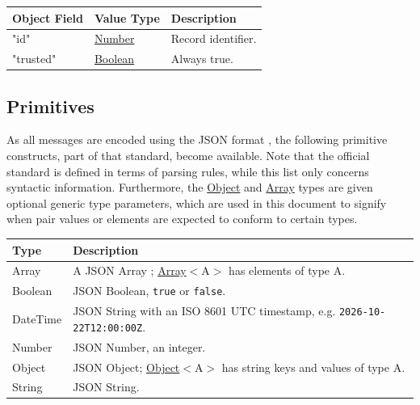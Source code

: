 \documentclass[a4paper]{arrowhead}
\newcommand{\pdef}[1]{{\textcolor{ArrowheadGrey}{#1 \label{sec:model:primitives:#1} \label{sec:model:primitives:#1s}}}}
\newcommand{\pref}[1]{{\textcolor{ArrowheadGrey}{\hyperref[sec:model:primitives:#1]{#1}}}}
\begin{document}




\noindent\begin{tabularx}{\textwidth}{| >{\raggedright\arraybackslash}p{3.9cm} | >{\raggedright\arraybackslash\small}p{5.3cm} | X |} \hline
\rowcolor{gray!33} Object Field & Value Type & Description \\ \hline
"id" & \pref{Number} & Record identifier. \\ \hline
"trusted" & \pref{Boolean} & Always true. \\ \hline
\end{tabularx}



\subsection{Primitives}
\label{sec:model:primitives}

As all messages are encoded using the JSON format \cite{rfc8259}, the following primitive constructs, part of that standard, become available.
Note that the official standard is defined in terms of parsing rules, while this list only concerns syntactic information.
Furthermore, the \pref{Object} and \pref{Array} types are given optional generic type parameters, which are used in this document to signify when pair values or elements are expected to conform to certain types.

\noindent\begin{tabularx}{\textwidth}{| p{4.6cm} | X |} \hline
\rowcolor{gray!33} Type & Description \\ \hline
\pdef{Array} & A JSON Array \cite{rfc8259}; \pref{Array}$<$A$>$ has elements of type A. \\ \hline
\pdef{Boolean} & JSON Boolean, \texttt{true} or \texttt{false}. \\ \hline
\pdef{DateTime} & JSON String with an ISO 8601 UTC timestamp, e.g. \texttt{2026-10-22T12:00:00Z}. \\ \hline
\pdef{Number} & JSON Number, an integer. \\ \hline
\pdef{Object} & JSON Object; \pref{Object}$<$A$>$ has string keys and values of type A. \\ \hline
\pdef{String} & JSON String. \\ \hline
\end{tabularx}

\newpage



\end{document}

